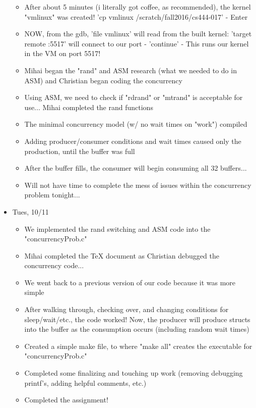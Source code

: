 \documentclass[letterpaper,10pt,onecolumn]{IEEEtran}
\begin{document}
\begin{itemize}
\begin{itemize}
    		\item After about 5 minutes (i literally got coffee, as recommended), the kernel "vmlinux" was created! 'cp vmlinux /scratch/fall2016/cs444-017'	-	Enter
    		\item NOW, from the gdb, 'file vmlinux' will read from the built kernel: 'target remote :5517' will connect to our port	-	'continue'	-	This runs our kernel in the VM on port 5517!
    		\item Mihai began the "rand" and ASM research (what we needed to do in ASM) and Christian began coding the concurrency
    		\item Using ASM, we need to check if "rdrand" or "mtrand" is acceptable for use... Mihai completed the rand functions
    		\item The minimal concurrency model (w/ no wait times on "work") compiled
    		\item Adding producer/consumer conditions and wait times caused only the production, until the buffer was full
    		\item After the buffer fills, the consumer will begin consuming all 32 buffers... 
    		\item Will not have time to complete the mess of issues within the concurrency problem tonight...
    	\end{itemize}
    \item Tues, 10/11
        \begin{itemize} 
    	    \item We implemented the rand switching and ASM code into the "concurrencyProb.c"
    		\item Mihai completed the TeX document as Christian debugged the concurrency code...
    		\item We went back to a previous version of our code because it was more simple
    		\item After walking through, checking over, and changing conditions for sleep/wait/etc., the code worked! Now, the producer will produce structs into the buffer as the consumption occurs (including random wait times)
    	    \item Created a simple make file, to where "make all" creates the executable for "concurrencyProb.c"
    		\item Completed some finalizing and touching up work (removing debugging printf's, adding helpful comments, etc.)
    		\item Completed the assignment!
    	\end{itemize}
    \end{itemize}
    
\end{document}
